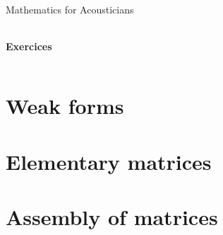 \documentclass[10pt,a4paper]{report}
\begin{document}
\begin{center}
{\Large Mathematics for Acousticians}
 \begin{tabularx}{\linewidth}{c}
\hline
\end{tabularx}
\end{center}
\begin{center}
 {\Large \textbf{Exercices}\\}
\end{center}
 \begin{tabularx}{\linewidth}{c}
\hline
\end{tabularx}
\setcounter{chapter}{1}



\section{Weak forms}






\section{Elementary matrices}






\section{Assembly of matrices}


\end{document}
